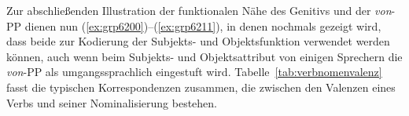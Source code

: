\begin{exe}
  \ex\label{ex:grp8090}
  \begin{xlist}
  \end{xlist}
\end{exe}

Zur abschließenden Illustration der funktionalen Nähe des Genitivs und der \textit{von}-PP dienen nun (\ref{ex:grp6200})--(\ref{ex:grp6211}), in denen nochmals gezeigt wird, dass beide zur Kodierung der Subjekts- und Objektsfunktion verwendet werden können, auch wenn beim Subjekts- und Objektsattribut von einigen Sprechern die \textit{von}-PP als umgangssprachlich eingestuft wird.
Tabelle~\ref{tab:verbnomenvalenz} fasst die typischen Korrespondenzen zusammen, die zwischen den Valenzen eines Verbs und seiner Nominalisierung bestehen.

\begin{exe}
  \ex\label{ex:grp6200} 
  \begin{xlist}
  \end{xlist}
  \ex\label{ex:grp6201} 
  \begin{xlist}
  \end{xlist}
  \ex\label{ex:grp6211} 
  \begin{xlist}
  \end{xlist}
\end{exe}

